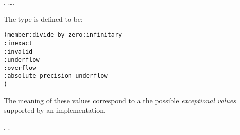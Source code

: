 \documentclass[../Exception-Handling.tex]{subfiles}
\begin{document}

\DSupertypes{}

, \ldots, 

\DDescription{}

The  type is defined to be:
\begin{alltt}
(member :divide-by-zero :infinitary
        :inexact
        :invalid
        :underflow
        :overflow
        :absolute-precision-underflow
        )
\end{alltt}
The meaning of these values correspond to a the possible
\emph{exceptional values} supported by an implementation.

\DSeeAlso{}

, .
\end{document}
